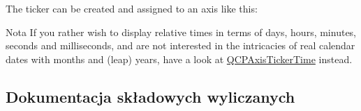 The ticker can be created and assigned to an axis like this\+: 
\begin{DoxyCodeInclude}
\end{DoxyCodeInclude}
 \begin{DoxyNote}{Nota}
If you rather wish to display relative times in terms of days, hours, minutes, seconds and milliseconds, and are not interested in the intricacies of real calendar dates with months and (leap) years, have a look at \hyperlink{class_q_c_p_axis_ticker_time}{Q\+C\+P\+Axis\+Ticker\+Time} instead. 
\end{DoxyNote}


\subsection{Dokumentacja składowych wyliczanych}
